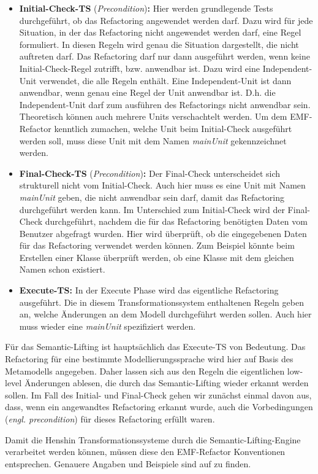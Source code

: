\begin{itemize}
  \item \textbf{Initial-Check-TS} (\textit{Precondition})\textbf{:} Hier werden grundlegende Tests
  durchgeführt, ob das Refactoring angewendet werden darf. Dazu wird für jede Situation, in der das
  Refactoring nicht angewendet werden darf, eine Regel formuliert. In diesen Regeln wird genau die
  Situation dargestellt, die nicht auftreten darf. Das Refactoring darf nur dann ausgeführt werden,
  wenn keine Initial-Check-Regel zutrifft, bzw. anwendbar ist. Dazu wird eine Independent-Unit
  verwendet, die alle Regeln enthält. Eine Independent-Unit ist dann anwendbar, wenn genau eine
  Regel der Unit anwendbar ist. D.h. die Independent-Unit darf zum ausführen des Refactorings nicht
  anwendbar sein. Theoretisch können auch mehrere Units verschachtelt werden. Um dem EMF-Refactor
  kenntlich zumachen, welche Unit beim Initial-Check ausgeführt werden soll, muss diese Unit mit dem
  Namen \textit{mainUnit} gekennzeichnet werden.
  
  \item \textbf{Final-Check-TS}  (\textit{Precondition})\textbf{:} Der Final-Check unterscheidet
  sich strukturell nicht vom Initial-Check. Auch hier muss es eine Unit mit Namen \textit{mainUnit} 
  geben, die nicht anwendbar sein darf, damit das Refactoring durchgeführt werden kann. Im
 Unterschied zum Initial-Check wird der Final-Check durchgeführt, nachdem die für das Refactoring
 benötigten Daten vom Benutzer abgefragt wurden. Hier wird überprüft, ob die eingegebenen Daten für
 das Refactoring verwendet werden können. Zum Beispiel könnte beim Erstellen einer Klasse überprüft
 werden, ob eine Klasse mit dem gleichen Namen schon existiert.
 
  \item \textbf{Execute-TS:} In der Execute Phase wird das eigentliche Refactoring ausgeführt. Die
  in diesem Transformationssystem enthaltenen Regeln geben an, welche Änderungen an dem Modell
  durchgeführt werden sollen. Auch hier muss wieder eine \textit{mainUnit} spezifiziert werden.
\end{itemize}
Für das Semantic-Lifting ist hauptsächlich das Execute-TS von Bedeutung. Das Refactoring für eine
bestimmte Modellierungssprache wird hier auf Basis des Metamodells angegeben. Daher lassen sich aus
den Regeln die eigentlichen low-level Änderungen ablesen, die durch das Semantic-Lifting wieder
erkannt werden sollen. Im Fall des Initial- und Final-Check gehen wir zunächst einmal davon aus,
dass, wenn ein angewandtes Refactoring erkannt wurde, auch die Vorbedingungen
(\textit{engl. precondition}) für dieses Refactoring erfüllt waren.

Damit die Henshin Transformationssysteme durch die Semantic-Lifting-Engine verarbeitet werden
können, müssen diese den EMF-Refactor Konventionen entsprechen. Genauere Angaben und Beispiele sind
auf \cite{ERe} zu finden.
